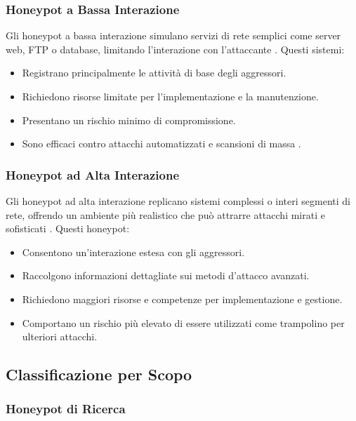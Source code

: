 \documentclass[a4paper,12pt]{report}
\begin{document}
\subsubsection{Honeypot a Bassa Interazione}
\label{subsubsec:bassa_interazione}

Gli honeypot a bassa interazione simulano servizi di rete semplici come server web, FTP o database, limitando l'interazione con l'attaccante \cite{vito2024}. Questi sistemi:
\begin{itemize}
    \item Registrano principalmente le attività di base degli aggressori.
    \item Richiedono risorse limitate per l'implementazione e la manutenzione.
    \item Presentano un rischio minimo di compromissione.
    \item Sono efficaci contro attacchi automatizzati e scansioni di massa \cite{nordvpn}.
\end{itemize}

\subsubsection{Honeypot ad Alta Interazione}
\label{subsubsec:alta_interazione}

Gli honeypot ad alta interazione replicano sistemi complessi o interi segmenti di rete, offrendo un ambiente più realistico che può attrarre attacchi mirati e sofisticati \cite{vito2024}. Questi honeypot:
\begin{itemize}
    \item Consentono un'interazione estesa con gli aggressori.
    \item Raccolgono informazioni dettagliate sui metodi d'attacco avanzati.
    \item Richiedono maggiori risorse e competenze per implementazione e gestione.
    \item Comportano un rischio più elevato di essere utilizzati come trampolino per ulteriori attacchi.
\end{itemize}

\subsection{Classificazione per Scopo}
\label{subsec:class_scopo}

\subsubsection{Honeypot di Ricerca}
\label{subsubsec:ricerca}
\end{document}
